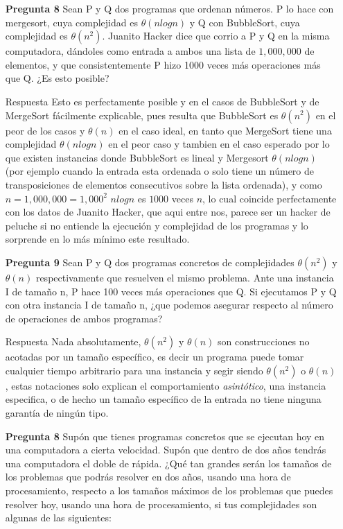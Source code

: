 \documentclass[12pt]{article}
\begin{document}
\begin{itemize}
\item[\bf{Pregunta 8}] Sean P y Q dos programas que ordenan números. P lo hace con mergesort, cuya complejidad es $\theta(n log n)$ y Q con BubbleSort, cuya complejidad es $\theta(n^2)$. Juanito Hacker dice que corrio a P y Q en la misma computadora, dándoles como entrada a ambos una lista de $1,000,000$ de elementos, y que consistentemente  P hizo 1000 veces más operaciones más que Q. ¿Es esto posible?

\item[Respuesta] Esto es perfectamente posible y en el casos de BubbleSort y de MergeSort fácilmente explicable, pues resulta que BubbleSort es $\theta(n^2)$ en el peor de los casos y $\theta(n)$ en el caso ideal, en tanto que MergeSort tiene una complejidad $\theta(n log n)$ en el peor caso y tambien en el caso esperado por lo que existen instancias donde BubbleSort es lineal y Mergesort $\theta(n log n)$ (por ejemplo cuando la entrada esta ordenada o solo tiene un número de transposiciones de elementos consecutivos sobre la lista ordenada), y como $n = 1,000,000 = 1,000^2$ $nlogn$ es $1000$ veces $n$, lo cual coincide perfectamente con los datos de Juanito Hacker, que aqui entre nos, parece ser un hacker de peluche si no entiende la ejecución y complejidad de los programas y lo sorprende en lo más mínimo este resultado.

\item[\bf{Pregunta 9}]Sean P y Q dos programas concretos de complejidades $\theta(n^2)$ y $\theta(n)$ respectivamente que resuelven el mismo problema. Ante una instancia I de tamaño n, P hace 100 veces más operaciones que Q. Si ejecutamos P y Q con otra instancia I de tamaño n, ¿que podemos asegurar respecto al número de operaciones de ambos programas?

\item[Respuesta] Nada absolutamente, $\theta(n^2)$ y $\theta(n)$ son construcciones no acotadas por un tamaño específico, es decir un programa puede tomar cualquier tiempo arbitrario para una instancia y segir siendo $\theta(n^2)$ o $\theta(n)$, estas notaciones solo explican el comportamiento \emph{asintótico}, una instancia especifica, o de hecho un tamaño específico de la entrada no tiene ninguna garantía de ningún tipo.

\item[\bf{Pregunta 8}]Supón que tienes programas concretos que se ejecutan hoy en una computadora a cierta velocidad. Supón que dentro de dos años tendrás una computadora el doble de rápida. ¿Qué tan grandes serán los tamaños de los problemas que podrás resolver en dos años, usando una hora de procesamiento, respecto a los tamaños máximos de los problemas que puedes resolver hoy, usando una hora de procesamiento, si tus complejidades son algunas de las siguientes:\\


\end{itemize}
\end{document}
